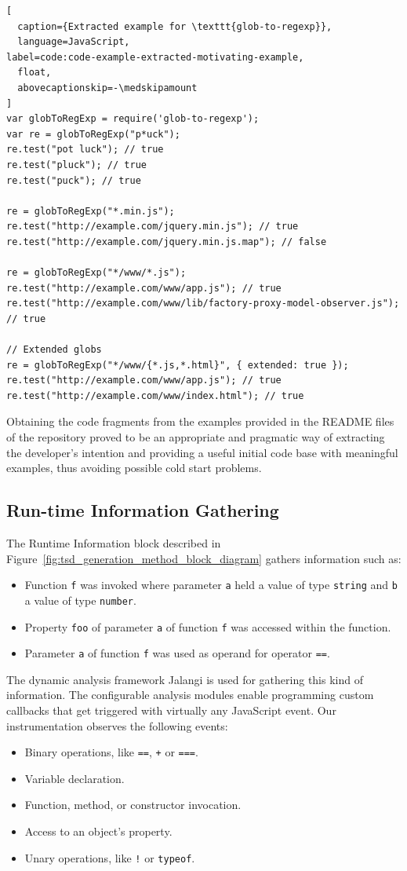 \documentclass[a4paper,english,cleveref, autoref]{lipics-v2019}
\newcommand{\figref}[1]{Figure~\ref{#1}}
\begin{document}
\begin{lstlisting}[
  caption={Extracted example for \texttt{glob-to-regexp}},
  language=JavaScript,
label=code:code-example-extracted-motivating-example,
  float,
  abovecaptionskip=-\medskipamount
]
var globToRegExp = require('glob-to-regexp');
var re = globToRegExp("p*uck");
re.test("pot luck"); // true
re.test("pluck"); // true
re.test("puck"); // true

re = globToRegExp("*.min.js");
re.test("http://example.com/jquery.min.js"); // true
re.test("http://example.com/jquery.min.js.map"); // false

re = globToRegExp("*/www/*.js");
re.test("http://example.com/www/app.js"); // true
re.test("http://example.com/www/lib/factory-proxy-model-observer.js"); // true

// Extended globs
re = globToRegExp("*/www/{*.js,*.html}", { extended: true });
re.test("http://example.com/www/app.js"); // true
re.test("http://example.com/www/index.html"); // true
\end{lstlisting}

Obtaining the code fragments from the examples provided in the
README files of the repository proved to be an
appropriate and pragmatic way of extracting the developer's
intention and providing a useful initial code base with meaningful
examples, thus avoiding possible cold start problems.

\subsection{Run-time Information Gathering}
The Runtime Information block described in
\figref{fig:tsd_generation_method_block_diagram} gathers
information such as: 

\begin{itemize}
  \item Function \lstinline{f} was invoked where parameter
    \lstinline{a} held a value of type \lstinline{string} and
    \lstinline{b} a value of type \lstinline{number}. 
  \item Property \lstinline{foo} of parameter \lstinline{a} of
    function \lstinline{f} was accessed within the function. 
  \item Parameter \lstinline{a} of function \lstinline{f} was used as
    operand for operator \lstinline{==}. 
\end{itemize}

The dynamic analysis framework Jalangi is used for gathering this kind of
information. The configurable analysis modules enable
programming custom callbacks that get triggered with virtually any
JavaScript event. Our instrumentation observes the following events: 
\begin{itemize}
  \item Binary operations, like \lstinline{==}, \lstinline{+} or
    \lstinline{===}.  
  \item Variable declaration.
  \item Function, method, or constructor invocation.
  \item Access to an object's property.
  \item Unary operations, like \lstinline{!} or \lstinline{typeof}.
\end{itemize}
\end{document}
